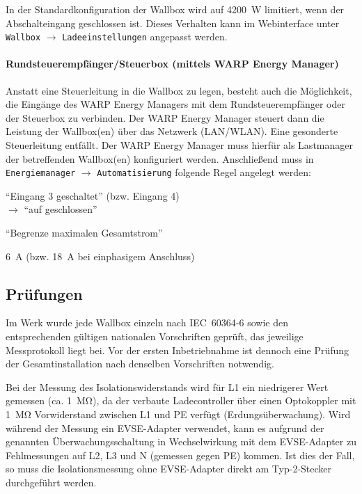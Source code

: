 \documentclass[a4paper,10pt]{article}
\begin{document}
\begin{multicols*}{2}
	In der Standardkonfiguration der Wallbox wird auf \SI{4200}{\watt} limitiert, wenn der Abschalteingang geschlossen ist. Dieses Verhalten kann im Webinterface unter \texttt{Wallbox} $\rightarrow$ \texttt{Ladeeinstellungen} angepasst werden.

    \paragraph*{Rundsteuerempfänger/Steuerbox (mittels WARP Energy Manager)}
    Anstatt eine Steuerleitung in die Wallbox zu legen, besteht auch die
    Möglichkeit, die Eingänge des WARP Energy Managers mit dem Rundsteuerempfänger oder der
    Steuerbox zu verbinden. Der WARP Energy Manager steuert dann die
    Leistung der Wallbox(en) über das Netzwerk (LAN/WLAN). Eine gesonderte
    Steuerleitung entfällt.
    Der WARP Energy Manager muss hierfür als Lastmanager der betreffenden Wallbox(en) konfiguriert werden.
    Anschließend muss in \texttt{Energiemanager} $\rightarrow$ \texttt{Automatisierung}
    folgende Regel angelegt werden:

    \begin{description}[labelindent=0.5cm]
        \item[Bedingung] \enquote{Eingang 3 geschaltet} (bzw. Eingang 4)\\\hspace{-0.5cm} $\rightarrow$ \enquote{auf geschlossen}
        \item[Aktion] \enquote{Begrenze maximalen Gesamtstrom}
        \item[Maximaler Gesamtstrom] \SI{6}{\ampere} (bzw. \SI{18}{\ampere} bei einphasigem Anschluss)
    \end{description}

    \subsection{Prüfungen}\label{tests}
    Im Werk wurde jede Wallbox einzeln nach IEC~60364-6 sowie den entsprechenden gültigen
    nationalen Vorschriften geprüft, das jeweilige Messprotokoll liegt bei.
    Vor der ersten Inbetriebnahme ist dennoch eine Prüfung der Gesamtinstallation
    nach denselben Vorschriften notwendig.

    Bei der Messung des Isolationswiderstands wird für L1 ein niedrigerer Wert
    gemessen (ca. \SI{1}{\mega\ohm}), da der verbaute Ladecontroller über einen Optokoppler mit
    \SI{1}{\mega\ohm} Vorwiderstand zwischen L1 und
    PE verfügt (Erdungsüberwachung). Wird während der Messung ein EVSE-Adapter verwendet,
    kann es aufgrund der genannten Überwachungsschaltung in Wechselwirkung mit dem EVSE-Adapter zu Fehlmessungen
    auf L2, L3 und N (gemessen gegen PE) kommen. Ist dies der Fall, so muss die Isolationsmessung
    ohne EVSE-Adapter direkt am Typ-2-Stecker durchgeführt werden.


\end{multicols*}
\end{document}
